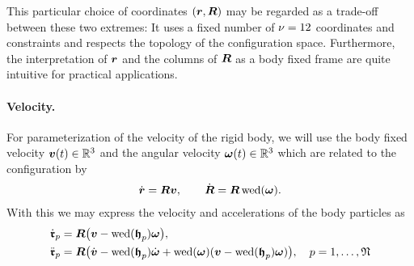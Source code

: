 This particular choice of coordinates $(\boldsymbol{r}, \boldsymbol{R})$ may be regarded as a trade-off between these two extremes:
It uses a fixed number of $\nu=12$ coordinates and constraints and respects the topology of the configuration space.
Furthermore, the interpretation of $\boldsymbol{r}$ and the columns of $\boldsymbol{R}$ as a body fixed frame are quite intuitive for practical applications.

\paragraph*{Velocity.}
For parameterization of the velocity of the rigid body, we will use the body fixed velocity $\boldsymbol{v}(t)\in \mathbb{R}^3$ and the angular velocity $\boldsymbol{\omega}(t)\in \mathbb{R}^3$ which are related to the configuration by
\begin{align}\label{eq:RBKinematicEq1}
 \dot{\boldsymbol{r}} = \boldsymbol{R} \boldsymbol{v}, \qquad \dot{\boldsymbol{R}} = \boldsymbol{R} \operatorname{wed}(\boldsymbol{\omega}).
\end{align}
With this we may express the velocity and accelerations of the body particles as
\begin{subequations}
\begin{align}
 \label{eq:RBParticleVel}
 \dot{\boldsymbol{\mathfrak{r}}}_{p} &= \boldsymbol{R} \big( \boldsymbol{v} - \operatorname{wed}(\boldsymbol{\mathfrak{h}}_{p}) \boldsymbol{\omega} \big),
\\
 \label{eq:RBParticleAcc}
 \ddot{\boldsymbol{\mathfrak{r}}}_{p} &= \boldsymbol{R} \big( \dot{\boldsymbol{v}} - \operatorname{wed}(\boldsymbol{\mathfrak{h}}_{p})\dot{\boldsymbol{\omega}} + \operatorname{wed}(\boldsymbol{\omega})(\boldsymbol{v} - \operatorname{wed}(\boldsymbol{\mathfrak{h}}_{p})\boldsymbol{\omega}) \big), \quad p=1,\ldots,\mathfrak{N}
\end{align}
\end{subequations}

